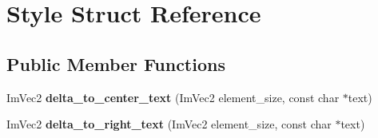 \hypertarget{struct_style}{}\section{Style Struct Reference}
\label{struct_style}
\subsection*{Public Member Functions}
\begin{DoxyCompactItemize}
\item 
\mbox{\label{struct_style_a0b917f3f78d79591b2ce4082e45c8186}} 
Im\+Vec2 {\bfseries delta\+\_\+to\+\_\+center\+\_\+text} (Im\+Vec2 element\+\_\+size, const char $\ast$text)
\item 
\mbox{\label{struct_style_ae4d953c69440e1a825d81bfb85a32abf}} 
Im\+Vec2 {\bfseries delta\+\_\+to\+\_\+right\+\_\+text} (Im\+Vec2 element\+\_\+size, const char $\ast$text)
\end{DoxyCompactItemize}
